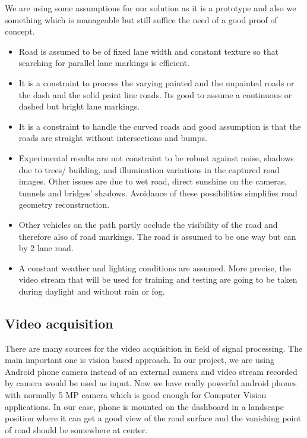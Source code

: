 We are using some assumptions for our solution as it is a prototype and also we
something which is manageable but still suffice the need of a good proof of concept. 

\begin{itemize}
\item Road is assumed to be of fixed lane width and constant texture so that
searching for parallel lane markings is efficient.
\item It is a constraint to process the varying painted and the unpainted roads or
the dash and the solid paint line roads. Its good to assume a continuous or dashed but bright
lane markings.
\item It is a constraint to handle the curved roads and good assumption is that the
roads are straight without intersections and bumps.
\item Experimental results are not constraint to be robust against noise, shadows
due to trees/ building, and illumination variations in the captured road images. Other issues
are due to wet road, direct sunshine on the cameras, tunnels and bridges' shadows.
Avoidance of these possibilities simplifies road geometry reconstruction. 
\item Other vehicles on the path partly occlude the visibility of the road and
    therefore also of road markings. The road is assumed to be one way but can by 2 lane road.
\item A constant weather and lighting conditions are assumed. More precise, the 
    video stream that will be used for training and testing are going to be taken 
    during daylight and without rain or fog.
\end{itemize}

\subsection{Video acquisition}

There are many sources for the video acquisition in field of signal processing.
The main important one is vision based approach. In our project, we are using
Android phone camera instead of an external camera and video stream recorded by camera would
be used as input. Now we have really powerful android phones with normally 5 MP camera
which is good enough for Computer Vision applications. In our case, phone is mounted on the
dashboard in a landscape position where it can get a good view of the road surface and the
vanishing point of road should be somewhere at center.

